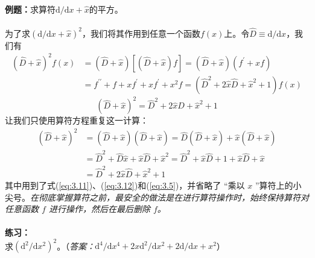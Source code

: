 	\begin{examplebox}
		\textbf{例题：}求算符$\mathrm{d}/\mathrm{d}x+\hat{x}$的平方。\\
		\\
		为了求$\left(\mathrm{d}/\mathrm{d}x+\hat{x}\right)^2$，我们将其作用到任意一个函数$f\left(x\right)$上。令$\hat{D} \equiv \mathrm{d}/\mathrm{d}x$，我们有
		\begin{equation*}
			\begin{aligned}
				\left(\hat{D}+\hat{x}\right)^2f\left(x\right) & = \left(\hat{D}+\hat{x}\right)\left[\left(\hat{D}+\hat{x}\right)f\right] = \left(\hat{D}+\hat{x}\right)\left(f^{\prime}+xf\right) \\
				& = f^{\prime \prime}+f+xf^{\prime}+xf^{\prime}+x^2f=\left(\hat{D}^2+2\hat{x}\hat{D}+\hat{x}^2+1\right)f\left(x\right)
			\end{aligned}
		\end{equation*}
		\begin{equation*}
			\left(\hat{D}+\hat{x}\right)^2 = \hat{D}^2+2\hat{x}\hat{D}+\hat{x}^2+1
		\end{equation*}
		让我们只使用算符方程重复这一计算：
		\begin{equation*}
			\begin{aligned}
				\left(\hat{D}+\hat{x}\right)^2 & = \left(\hat{D}+\hat{x}\right)\left(\hat{D}+\hat{x}\right) = \hat{D}\left(\hat{D}+\hat{x}\right)+\hat{x}\left(\hat{D}+\hat{x}\right) \\
				& = \hat{D}^2+\hat{D}\hat{x}+\hat{x}\hat{D}+\hat{x}^2 = \hat{D}^2+\hat{x}\hat{D}+1+\hat{x}\hat{D}+\hat{x} \\
				& = \hat{D}^2+2\hat{x}\hat{D}+\hat{x}^2+1
			\end{aligned}
		\end{equation*}
		其中用到了式(\ref{eq:3.11})、(\ref{eq:3.12})和(\ref{eq:3.5})，并省略了 “乘以 $x$ ”算符上的小尖号。\textit{在彻底掌握算符之前，最安全的做法是在进行算符操作时，始终保持算符对任意函数 $f$ 进行操作，然后在最后删除 $f$。}\\
		\\
		\textbf{练习：}\\
		求$\left(\mathrm{d}^2/\mathrm{d}x^2\right)^2$。（\textit{答案：}$\mathrm{d}^4/\mathrm{d}x^4+2x\mathrm{d}^2/\mathrm{d}x^2+2\mathrm{d}/\mathrm{d}x+x^2$）
	\end{examplebox}
	
